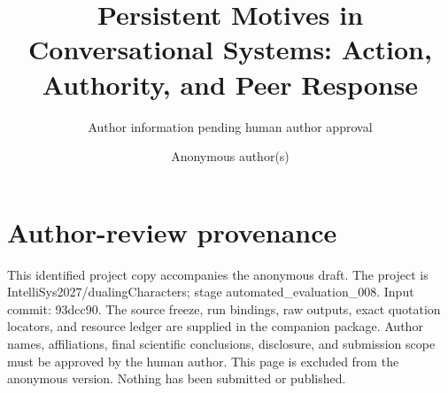 \documentclass{svproc}
\begin{document}
\mainmatter
\title{Persistent Motives in Conversational Systems: Action, Authority, and Peer Response}
\ifdefined\AuthorReview
\author{Author information pending human author approval}
\else
\author{Anonymous author(s)}
\fi
\maketitle
\begin{abstract}

\end{abstract}






\label{maintextend}


\clearpage
\appendix

\ifdefined\AuthorReview
\section{Author-review provenance}
This identified project copy accompanies the anonymous draft. The project is IntelliSys2027/dualingCharacters; stage automated\_evaluation\_008. Input commit: 93dcc90. The source freeze, run bindings, raw outputs, exact quotation locators, and resource ledger are supplied in the companion package. Author names, affiliations, final scientific conclusions, disclosure, and submission scope must be approved by the human author. This page is excluded from the anonymous version. Nothing has been submitted or published.
\fi
\end{document}
